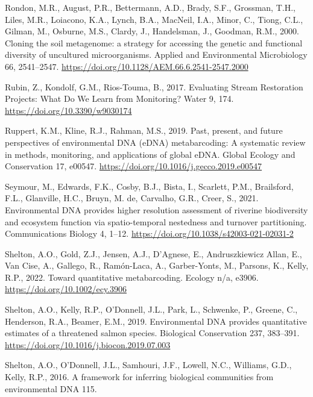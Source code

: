 \documentclass[
]{article}
\newlength{\cslhangindent}
\newlength{\cslentryspacingunit} %
\newenvironment{CSLReferences}[2] %
 {%
  \setlength{\parindent}{0pt}
  \ifodd #1
  \let\oldpar\par
  \def\par{\hangindent=\cslhangindent\oldpar}
  \fi
  \setlength{\parskip}{#2\cslentryspacingunit}
 }%
 {}
\begin{document}
\begin{CSLReferences}{1}{0}
\leavevmode{}%
Rondon, M.R., August, P.R., Bettermann, A.D., Brady, S.F., Grossman,
T.H., Liles, M.R., Loiacono, K.A., Lynch, B.A., MacNeil, I.A., Minor,
C., Tiong, C.L., Gilman, M., Osburne, M.S., Clardy, J., Handelsman, J.,
Goodman, R.M., 2000. Cloning the soil metagenome: a strategy for
accessing the genetic and functional diversity of uncultured
microorganisms. Applied and Environmental Microbiology 66, 2541--2547.
\url{https://doi.org/10.1128/AEM.66.6.2541-2547.2000}

\leavevmode{}%
Rubin, Z., Kondolf, G.M., Rios-Touma, B., 2017. Evaluating Stream
Restoration Projects: What Do We Learn from Monitoring? Water 9, 174.
\url{https://doi.org/10.3390/w9030174}

\leavevmode{}%
Ruppert, K.M., Kline, R.J., Rahman, M.S., 2019. Past, present, and
future perspectives of environmental DNA (eDNA) metabarcoding: A
systematic review in methods, monitoring, and applications of global
eDNA. Global Ecology and Conservation 17, e00547.
\url{https://doi.org/10.1016/j.gecco.2019.e00547}

\leavevmode{}%
Seymour, M., Edwards, F.K., Cosby, B.J., Bista, I., Scarlett, P.M.,
Brailsford, F.L., Glanville, H.C., Bruyn, M. de, Carvalho, G.R., Creer,
S., 2021. Environmental DNA provides higher resolution assessment of
riverine biodiversity and ecosystem function via spatio-temporal
nestedness and turnover partitioning. Communications Biology 4, 1--12.
\url{https://doi.org/10.1038/s42003-021-02031-2}

\leavevmode{}%
Shelton, A.O., Gold, Z.J., Jensen, A.J., D'Agnese, E., Andruszkiewicz
Allan, E., Van Cise, A., Gallego, R., Ramón-Laca, A., Garber-Yonts, M.,
Parsons, K., Kelly, R.P., 2022. Toward quantitative metabarcoding.
Ecology n/a, e3906. \url{https://doi.org/10.1002/ecy.3906}

\leavevmode{}%
Shelton, A.O., Kelly, R.P., O'Donnell, J.L., Park, L., Schwenke, P.,
Greene, C., Henderson, R.A., Beamer, E.M., 2019. Environmental DNA
provides quantitative estimates of a threatened salmon species.
Biological Conservation 237, 383--391.
\url{https://doi.org/10.1016/j.biocon.2019.07.003}

\leavevmode{}%
Shelton, A.O., O'Donnell, J.L., Samhouri, J.F., Lowell, N.C., Williams,
G.D., Kelly, R.P., 2016. A framework for inferring biological
communities from environmental DNA 115.


\end{CSLReferences}
\end{document}
